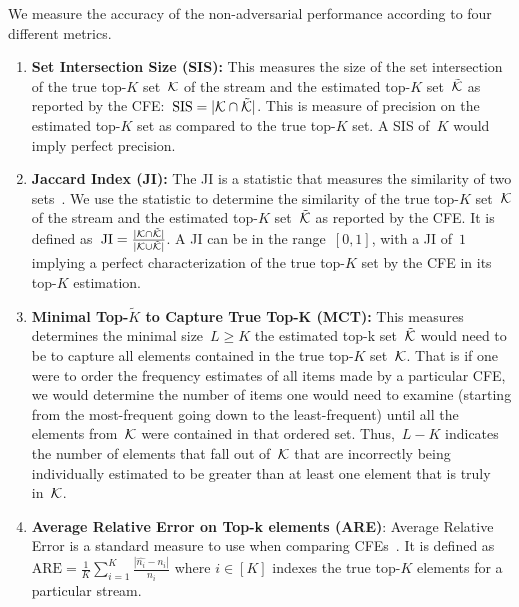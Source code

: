 We measure the accuracy of the non-adversarial performance according to four different metrics.

\begin{enumerate}[wide, labelwidth=!, labelindent=0pt]
    \item \textbf{Set Intersection Size (SIS):} This measures the size of the set intersection of the true top-$K$ set~$\mathcal{K}$ of the stream and the estimated top-$K$ set~$\tilde{\mathcal{K}}$ as reported by the CFE:~$\text{SIS} = |\mathcal{K} \cap \tilde{\mathcal{K}}|$. This is measure of precision on the estimated top-$K$ set as compared to the true top-$K$ set. A SIS of~$K$ would imply perfect precision. 
    
    \item \textbf{Jaccard Index (JI):} The JI is a statistic that measures the similarity of two sets~\cite{real1996probabilistic}. We use the statistic to determine the similarity of the true top-$K$ set~$\mathcal{K}$ of the stream and the estimated top-$K$ set~$\tilde{\mathcal{K}}$ as reported by the CFE. It is defined as~$\mathrm{JI} = \frac{|\mathcal{K} \cap \tilde{\mathcal{K}}|}{|\mathcal{K} \cup \tilde{\mathcal{K}}|}$. A JI can be in the range~$[0,1]$, with a JI of~$1$ implying a perfect characterization of the true top-$K$ set by the CFE in its top-$K$ estimation. 
    
    \item \textbf{Minimal Top-$\tilde{K}$ to Capture True Top-K (MCT):} 
    This measures determines the minimal size~$L \geq K$ the estimated top-k set~$\tilde{\mathcal{K}}$ would need to be to capture all elements contained in the true top-$K$ set~$\mathcal{K}$. That is if one were to order the frequency estimates of all items made by a particular CFE, we would determine the number of items one would need to examine (starting from the most-frequent going down to the least-frequent) until all the elements from~$\mathcal{K}$ were contained in that ordered set. Thus,~$L-K$ indicates the number of elements that fall out of~$\mathcal{K}$ that are incorrectly being individually estimated to be greater than at least one element that is truly in~$\mathcal{K}$. 
    
    \item \textbf{Average Relative Error on Top-k  elements (ARE)}:
    Average Relative Error is a standard measure to use when comparing CFEs~\cite{yang2019heavykeeper}. It is defined as~$\mathrm{ARE} = \frac{1}{K} \sum_{i=1}^{K} \frac{| \hat{n_{i}} - n_{i}|}{n_{i}}$
    where $i \in [K]$ indexes the true top-$K$ elements for a particular stream.
\end{enumerate}

